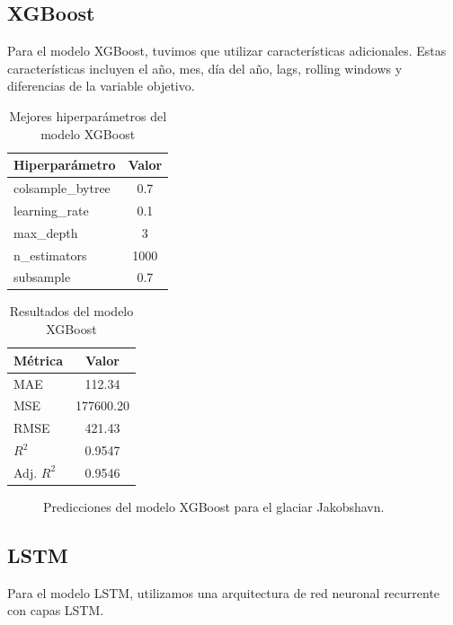 \documentclass[sigconf,authordraft,language=spanish]{acmart}
\begin{document}
\subsection{XGBoost}

Para el modelo XGBoost, tuvimos que utilizar características adicionales.
Estas características incluyen el año, mes, día del año, lags, rolling windows y diferencias de la variable objetivo.

\begin{table}[H]
  \caption{Mejores hiperparámetros del modelo XGBoost}
  \label{tab:xgb_params}
  \begin{tabular}{lc}
    \toprule
    Hiperparámetro & Valor \\
    \midrule
    colsample\_bytree & 0.7 \\
    learning\_rate & 0.1 \\
    max\_depth & 3 \\
    n\_estimators & 1000 \\
    subsample & 0.7 \\
    \bottomrule
  \end{tabular}
\end{table}

\begin{table}[H]
  \caption{Resultados del modelo XGBoost}
  \label{tab:xgb}
  \begin{tabular}{lc}
    \toprule
    Métrica & Valor \\
    \midrule
    MAE & 112.34 \\
    MSE & 177600.20 \\
    RMSE & 421.43 \\
    $R^2$ & 0.9547 \\
    Adj. $R^2$ & 0.9546 \\
    \bottomrule
  \end{tabular}
\end{table}

\begin{figure}[htbp]
   \centering
   
    \caption{Predicciones del modelo XGBoost para el glaciar Jakobshavn.}
    \label{fig:jakobshavn_xgb}
\end{figure}


\subsection{LSTM}

Para el modelo LSTM, utilizamos una arquitectura de red neuronal recurrente con capas LSTM.
\end{document}

